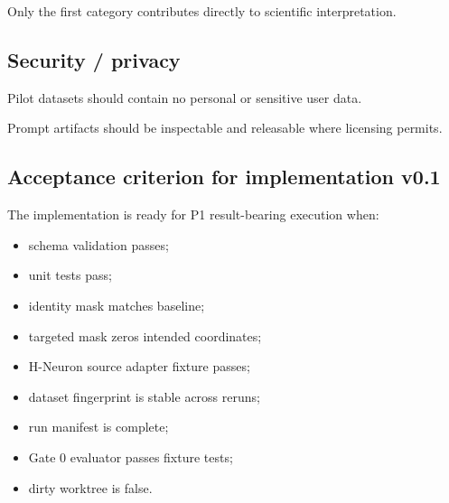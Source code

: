 Only the first category contributes directly to scientific interpretation.

\subsection{Security / privacy}\label{security-privacy}

Pilot datasets should contain no personal or sensitive user data.

Prompt artifacts should be inspectable and releasable where licensing permits.

\subsection{Acceptance criterion for implementation v0.1}\label{acceptance-criterion-for-implementation-v0.1}

The implementation is ready for P1 result-bearing execution when:

\begin{itemize}
\tightlist
\item
  schema validation passes;
\item
  unit tests pass;
\item
  identity mask matches baseline;
\item
  targeted mask zeros intended coordinates;
\item
  H-Neuron source adapter fixture passes;
\item
  dataset fingerprint is stable across reruns;
\item
  run manifest is complete;
\item
  Gate 0 evaluator passes fixture tests;
\item
  dirty worktree is false.
\end{itemize}
